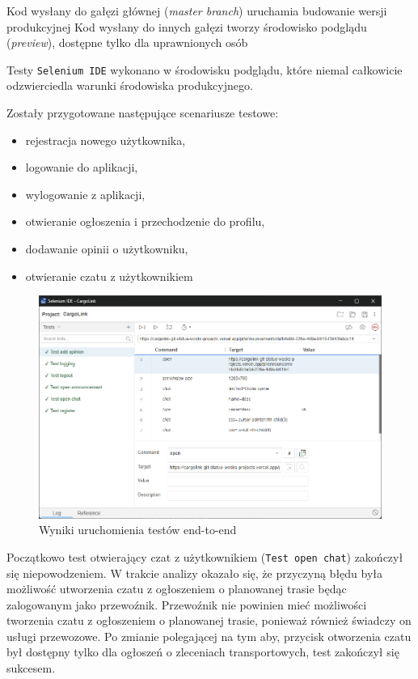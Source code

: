 Kod wysłany do gałęzi głównej (\emph{master branch}) uruchamia budowanie wersji produkcyjnej
Kod wysłany do innych gałęzi tworzy środowisko podglądu (\emph{preview}), dostępne tylko dla uprawnionych osób

Testy \texttt{Selenium IDE} wykonano w środowisku podglądu, które niemal całkowicie odzwierciedla warunki środowiska produkcyjnego.

Zostały przygotowane następujące scenariusze testowe:
\begin{itemize}
  \item rejestracja nowego użytkownika,
  \item logowanie do aplikacji,
  \item wylogowanie z aplikacji,
  \item otwieranie ogłoszenia i przechodzenie do profilu,
  \item dodawanie opinii o użytkowniku,
  \item otwieranie czatu z użytkownikiem
\end{itemize}

\begin{figure}[H]
  \centering
    \includegraphics[width=1\linewidth]{rozdzial2/test_end_to_end_wyniki.png}
  \caption{Wyniki uruchomienia testów end-to-end}
  \label{Testy end-to-end wyniki}
\end{figure}

Początkowo test otwierający czat z użytkownikiem (\texttt{Test open chat}) zakończył się niepowodzeniem. W trakcie analizy okazało się, że przyczyną błędu była możliwość utworzenia czatu z ogłoszeniem o planowanej trasie będąc zalogowanym jako przewoźnik. Przewoźnik nie powinien mieć możliwości tworzenia czatu z ogłoszeniem o planowanej trasie, ponieważ również świadczy on usługi przewozowe. Po zmianie polegającej na tym aby, przycisk otworzenia czatu był dostępny tylko dla ogłoszeń o zleceniach transportowych, test zakończył się sukcesem.

